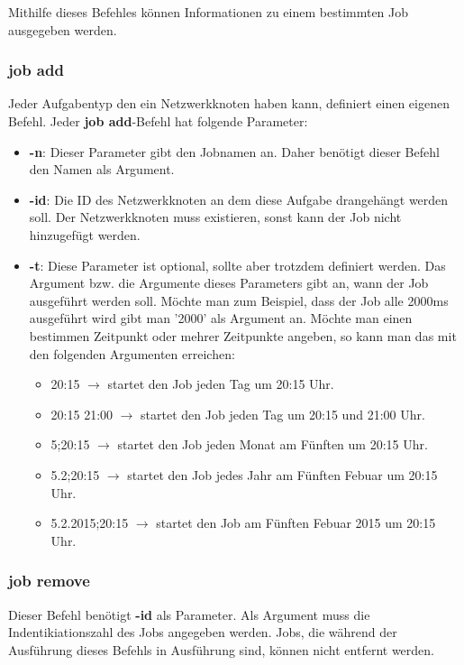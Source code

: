 \documentclass[12pt,a4paper]{report}
\begin{document}
Mithilfe dieses Befehles können Informationen zu einem bestimmten Job ausgegeben werden.

\subsubsection{job add}

Jeder Aufgabentyp den ein Netzwerkknoten haben kann, definiert einen eigenen Befehl. Jeder \textbf{job add}-Befehl hat folgende Parameter:

\begin{itemize}
\item \textbf{-n}: Dieser Parameter gibt den Jobnamen an. Daher benötigt dieser Befehl den Namen als Argument.
\item \textbf{-id}: Die ID des Netzwerkknoten an dem diese Aufgabe drangehängt werden soll. Der Netzwerkknoten muss existieren, sonst kann der Job nicht hinzugefügt werden.
\item \textbf{-t}: Diese Parameter ist optional, sollte aber trotzdem definiert werden. Das Argument bzw. die Argumente dieses Parameters gibt an, wann der Job ausgeführt werden soll. Möchte man zum Beispiel, dass der Job alle 2000ms ausgeführt wird gibt man '2000' als Argument an. Möchte man einen bestimmen Zeitpunkt oder mehrer Zeitpunkte angeben, so kann man das mit den folgenden Argumenten erreichen:
  \begin{itemize}
  \item 20:15 $\rightarrow$ startet den Job jeden Tag um 20:15 Uhr.
  \item 20:15 21:00 $\rightarrow$ startet den Job jeden Tag um 20:15 und 21:00 Uhr.
  \item 5;20:15 $\rightarrow$ startet den Job jeden Monat am Fünften um 20:15 Uhr.
  \item 5.2;20:15 $\rightarrow$ startet den Job jedes Jahr am Fünften Febuar um 20:15 Uhr.
  \item 5.2.2015;20:15 $\rightarrow$ startet den Job am Fünften Febuar 2015 um 20:15 Uhr.
  \end{itemize}
\end{itemize}

\subsubsection{job remove}

Dieser Befehl benötigt \textbf{-id} als Parameter. Als Argument muss die Indentikiationszahl des Jobs angegeben werden. Jobs, die während der Ausführung dieses Befehls in Ausführung sind, können nicht entfernt werden.
\end{document}
